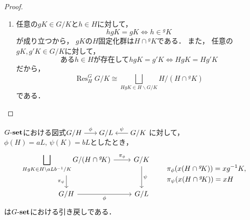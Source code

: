 \documentclass{jlreq}
\newcommand{\Res}[2]{\mathop{\mathrm{Res}}\nolimits^{#1}_{#2}}
\newcommand{\Conj}[1]{{}^{#1}\!}
\newcommand{\FinGSets}[1]{{#1}\mathchar`-\mathbf{set}}
\begin{document}
	\begin{proof}
		\quad
		\begin{enumerate}
			\item 任意の$gK \in G/K$と$h \in H$に対して，
			\begin{equation}
				hgK = gK \iff h \in \Conj{g}K
			\end{equation}
			が成り立つから，
			$gK$の$H$固定化群は$H \cap \Conj{g}K$である．
			また，
			任意の$gK, g'K \in G/K$に対して，
			\begin{equation}
				\text{ある$h \in H$が存在して$h gK = g'K$} \iff HgK = Hg'K
			\end{equation}
			だから，
			\begin{equation}
				\Res{G}{H} G/K
				\cong \bigsqcup_{HgK \in H \backslash G / K} H/(H \cap \Conj{g}K)
			\end{equation}
			である．
		\end{enumerate}
	\end{proof}
	
	\begin{proposition}
		$\FinGSets{G}$における図式$%
		\begin{tikzcd}[cramped, sep = scriptsize]
			G/H \arrow[r, "\phi"] & G/L & G/K \arrow[l, "\psi"']
		\end{tikzcd}$
		に対して，
		$\phi(H) = aL,\, \psi(K) = bL$としたとき，
		\begin{equation}
			\begin{tikzcd}
				\displaystyle\bigsqcup_{HgK \in H \backslash aLb^{-1}/K} G/(H \cap \Conj{g}K) \arrow[r, "\pi_{\phi}"] \arrow[d, "\pi_{\psi}"'] & G/K \arrow[d, "\psi"] \\
				G/H \arrow[r, "\phi"']                                                                                            & G/L                   
			\end{tikzcd} \qquad \begin{aligned}
				&\pi_{\phi}(x(H \cap \Conj{g}K))
				= xg^{-1}K, \\
				&\pi_{\psi}(x(H \cap \Conj{g}K))
				= xH
			\end{aligned}
		\end{equation}
		は$\FinGSets{G}$における引き戻しである．
	\end{proposition}
	
\end{document}
